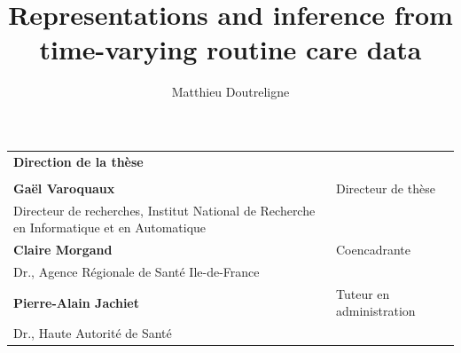 \documentclass[french,12pt,twoside,a4paper]{book}
\makeatletter
\renewcommand*{\maketitle}{\begingroup%
  \thispagestyle{empty}%
  \raggedleft%
  \vspace*{\baselineskip}
  \textcolor{ared}{\LARGE\bfseries\sffamily \@title}%
  \\[0.067\textheight]%
  \sffamily\Large\@author
  \vfill
  \endgroup}
\makeatother
\begin{document}
\begin{titlepage}
  \medskip
  \begin{tabular}{|p{7cm}l}
    \arrayrulecolor{Prune}
    {\footnotesize \textbf{Direction de la thèse}}                          \\
                                                 &                          \\
    \textbf{Gaël Varoquaux}                      & Directeur de thèse       \\
    Directeur de recherches, Institut National de Recherche en Informatique et
    en Automatique                               &                          \\
    \textbf{Claire Morgand}                      & Coencadrante             \\
    Dr., Agence Régionale de Santé Ile-de-France &                          \\
    \textbf{Pierre-Alain Jachiet}                & Tuteur en administration \\
    Dr., Haute Autorité de Santé
  \end{tabular}


\end{titlepage}




\title{Representations and inference from time-varying routine care data}
\author{Matthieu Doutreligne}
\maketitle%
\end{document}
